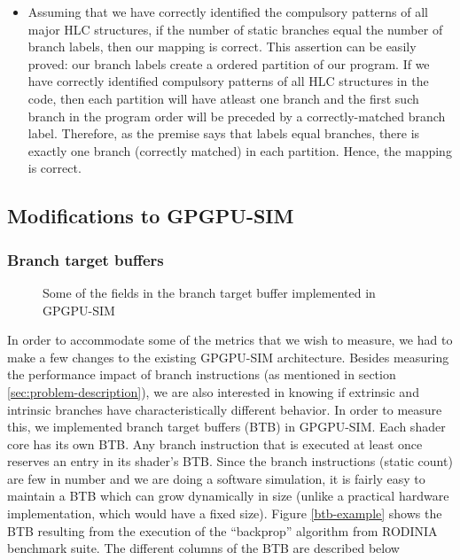 \begin{itemize}
	\item Assuming that we have correctly identified the compulsory patterns of all major HLC structures, if the number of static branches equal the number of branch labels, then our mapping is correct.
 This assertion can be easily proved: our branch labels create a ordered partition of our program. If we have correctly identified compulsory patterns of all HLC structures in the code, then each partition will have atleast one branch and the first such branch in the program order will be preceded by a correctly-matched branch label. Therefore, as the premise says that labels equal branches, there is exactly one branch (correctly matched) in each partition. Hence, the mapping is correct. 
\end{itemize}

\subsection{Modifications to GPGPU-SIM}
	\subsubsection*{Branch target buffers}
	\begin{figure*}
		
		\caption{Some of the fields in the branch target buffer implemented in GPGPU-SIM
			\label{fig:btb-example}}
	\end{figure*}
	\par{In order to accommodate some of the metrics that we wish to measure, we had to make a few changes to the existing GPGPU-SIM architecture. Besides measuring the performance impact of branch instructions (as mentioned in section \ref{sec:problem-description}), we are also interested in knowing if extrinsic and intrinsic branches have characteristically different behavior. In order to measure this, we implemented branch target buffers (BTB) in GPGPU-SIM. Each shader core has its own BTB. Any branch instruction that is executed at least once reserves an entry in its shader's BTB. Since the branch instructions (static count) are few in number and we are doing a software simulation, it is fairly easy to maintain a BTB which can grow dynamically in size (unlike a practical hardware implementation, which would have a fixed size). Figure \ref{btb-example} shows the BTB resulting from the execution of the ``backprop'' algorithm from RODINIA benchmark suite. The different columns of the BTB are described below}

